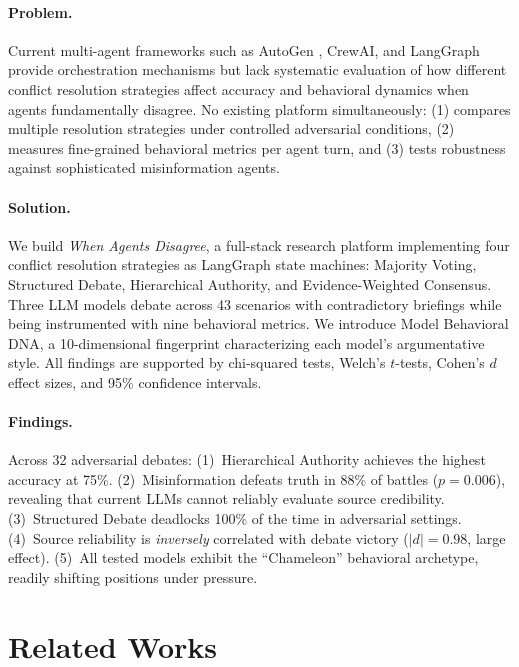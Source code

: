 \documentclass[11pt]{article}
\begin{document}
\paragraph{Problem.}
Current multi-agent frameworks such as AutoGen \cite{wu2023autogen}, CrewAI, and LangGraph provide orchestration mechanisms but lack systematic evaluation of how different conflict resolution strategies affect accuracy and behavioral dynamics when agents fundamentally disagree. No existing platform simultaneously: (1) compares multiple resolution strategies under controlled adversarial conditions, (2) measures fine-grained behavioral metrics per agent turn, and (3) tests robustness against sophisticated misinformation agents.

\paragraph{Solution.}
We build \textit{When Agents Disagree}, a full-stack research platform implementing four conflict resolution strategies as LangGraph state machines: Majority Voting, Structured Debate, Hierarchical Authority, and Evidence-Weighted Consensus. Three LLM models debate across 43 scenarios with contradictory briefings while being instrumented with nine behavioral metrics. We introduce Model Behavioral DNA, a 10-dimensional fingerprint characterizing each model's argumentative style. All findings are supported by chi-squared tests, Welch's $t$-tests, Cohen's $d$ effect sizes, and 95\% confidence intervals.

\paragraph{Findings.}
Across 32 adversarial debates: (1)~Hierarchical Authority achieves the highest accuracy at 75\%. (2)~Misinformation defeats truth in 88\% of battles ($p = 0.006$), revealing that current LLMs cannot reliably evaluate source credibility. (3)~Structured Debate deadlocks 100\% of the time in adversarial settings. (4)~Source reliability is \textit{inversely} correlated with debate victory ($|d| = 0.98$, large effect). (5)~All tested models exhibit the ``Chameleon'' behavioral archetype, readily shifting positions under pressure.

\section{Related Works}
\end{document}
